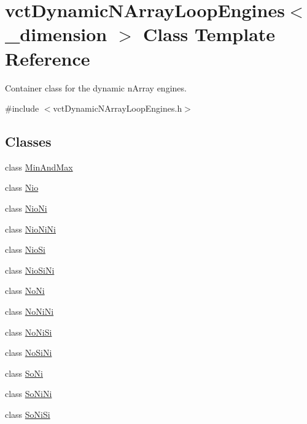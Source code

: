 \hypertarget{classvct_dynamic_n_array_loop_engines}{\section{vct\-Dynamic\-N\-Array\-Loop\-Engines$<$ \-\_\-dimension $>$ Class Template Reference}
\label{classvct_dynamic_n_array_loop_engines}
}


Container class for the dynamic n\-Array engines.  




{\ttfamily \#include $<$vct\-Dynamic\-N\-Array\-Loop\-Engines.\-h$>$}

\subsection*{Classes}
\begin{DoxyCompactItemize}
\item 
class \hyperlink{classvct_dynamic_n_array_loop_engines_1_1_min_and_max}{Min\-And\-Max}
\item 
class \hyperlink{classvct_dynamic_n_array_loop_engines_1_1_nio}{Nio}
\item 
class \hyperlink{classvct_dynamic_n_array_loop_engines_1_1_nio_ni}{Nio\-Ni}
\item 
class \hyperlink{classvct_dynamic_n_array_loop_engines_1_1_nio_ni_ni}{Nio\-Ni\-Ni}
\item 
class \hyperlink{classvct_dynamic_n_array_loop_engines_1_1_nio_si}{Nio\-Si}
\item 
class \hyperlink{classvct_dynamic_n_array_loop_engines_1_1_nio_si_ni}{Nio\-Si\-Ni}
\item 
class \hyperlink{classvct_dynamic_n_array_loop_engines_1_1_no_ni}{No\-Ni}
\item 
class \hyperlink{classvct_dynamic_n_array_loop_engines_1_1_no_ni_ni}{No\-Ni\-Ni}
\item 
class \hyperlink{classvct_dynamic_n_array_loop_engines_1_1_no_ni_si}{No\-Ni\-Si}
\item 
class \hyperlink{classvct_dynamic_n_array_loop_engines_1_1_no_si_ni}{No\-Si\-Ni}
\item 
class \hyperlink{classvct_dynamic_n_array_loop_engines_1_1_so_ni}{So\-Ni}
\item 
class \hyperlink{classvct_dynamic_n_array_loop_engines_1_1_so_ni_ni}{So\-Ni\-Ni}
\item 
class \hyperlink{classvct_dynamic_n_array_loop_engines_1_1_so_ni_si}{So\-Ni\-Si}
\end{DoxyCompactItemize}
